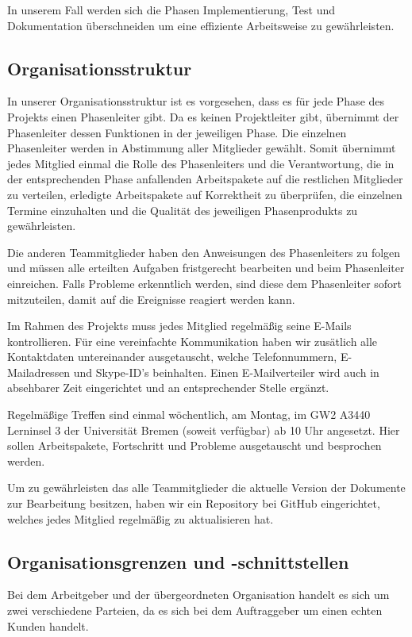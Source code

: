 \documentclass[fontsize=12pt,paper=a4,twoside]{scrartcl}
\begin{document}
In unserem Fall werden sich die Phasen Implementierung, Test und Dokumentation überschneiden um eine effiziente Arbeitsweise zu gewährleisten.

\subsection{Organisationsstruktur}
\label{sec:Orga}
In unserer Organisationsstruktur ist es vorgesehen, dass es für jede Phase des Projekts einen Phasenleiter gibt. Da es keinen Projektleiter gibt, übernimmt der Phasenleiter dessen Funktionen in der jeweiligen Phase. Die einzelnen Phasenleiter werden in Abstimmung aller Mitglieder gewählt. Somit übernimmt jedes Mitglied einmal die Rolle des Phasenleiters und die Verantwortung, die in der entsprechenden Phase anfallenden Arbeitspakete auf die restlichen Mitglieder zu verteilen, erledigte Arbeitspakete auf Korrektheit zu überprüfen, die einzelnen Termine einzuhalten und die Qualität des jeweiligen Phasenprodukts zu gewährleisten.

Die anderen Teammitglieder haben den Anweisungen des Phasenleiters zu folgen und müssen alle erteilten Aufgaben fristgerecht bearbeiten und beim Phasenleiter einreichen. Falls Probleme erkenntlich werden, sind diese dem Phasenleiter sofort mitzuteilen, damit auf die Ereignisse reagiert werden kann.

Im Rahmen des Projekts muss jedes Mitglied regelmäßig seine E-Mails kontrollieren. Für eine vereinfachte Kommunikation haben wir zusätlich alle Kontaktdaten untereinander ausgetauscht, welche Telefonnummern, E-Mailadressen und Skype-ID's beinhalten. Einen E-Mailverteiler wird auch in absehbarer Zeit eingerichtet und an entsprechender Stelle ergänzt.

Regelmäßige Treffen sind einmal wöchentlich, am Montag, im GW2 A3440 Lerninsel 3 der Universität Bremen (soweit verfügbar) ab 10 Uhr angesetzt. Hier sollen Arbeitspakete, Fortschritt und Probleme ausgetauscht und besprochen werden.

Um zu gewährleisten das alle Teammitglieder die aktuelle Version der Dokumente zur Bearbeitung besitzen, haben wir ein Repository bei GitHub eingerichtet, welches jedes Mitglied regelmäßig zu aktualisieren hat.

\subsection{Organisationsgrenzen und -schnittstellen}

Bei dem Arbeitgeber und der übergeordneten Organisation handelt es sich um zwei verschiedene Parteien, da es sich bei dem Auftraggeber um einen echten Kunden handelt.
\end{document}
